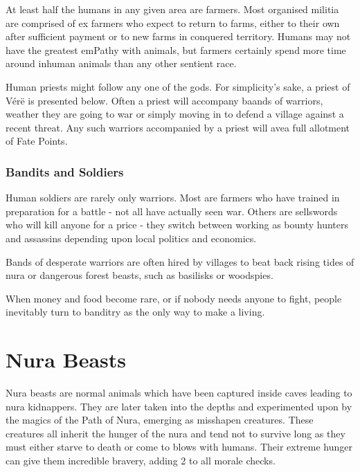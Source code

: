 \label{human_trader}
\humantrader

At least half the humans in any given area are farmers.  Most organised militia are comprised of ex farmers who expect to return to farms, either to their own after sufficient payment or to new farms in conquered territory.  Humans may not have the greatest emPathy with animals, but farmers certainly spend more time around inhuman animals than any other sentient race.

\label{human_priest}
\humanpriest

Human priests might follow any one of the gods.  For simplicity's sake, a priest of V\'{e}r\"{e} is presented below.
Often a priest will accompany baands of warriors, weather they are going to war or simply moving in to defend a village against a recent threat.  Any such warriors accompanied by a priest will avea full allotment of Fate Points.

\label{human_soldier}
\subsubsection{Bandits and Soldiers}
\humansoldier

Human soldiers are rarely only warriors.  Most are farmers who have trained in preparation for a battle - not all have actually seen war.  Others are sellswords who will kill anyone for a price - they switch between working as bounty hunters and assassins depending upon local politics and economics.

	Bands of desperate warriors are often hired by villages to beat back rising tides of nura or dangerous forest beasts, such as basilisks or woodspies.

When money and food become rare, or if nobody needs anyone to fight, people inevitably turn to banditry as the only way to make a living.

\section{Nura Beasts}

Nura beasts are normal animals which have been captured inside caves leading to nura kidnappers.  They are later taken into the depths and experimented upon by the magics of the Path of Nura, emerging as misshapen creatures.  These creatures all inherit the hunger of the nura and tend not to survive long as they must either starve to death or come to blows with humans.  Their extreme hunger can give them incredible bravery, adding 2 to all morale checks.

